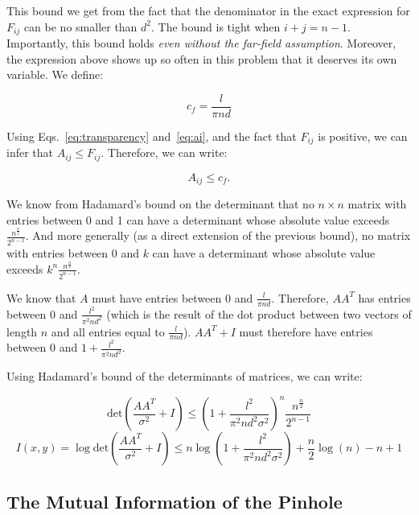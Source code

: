 \documentclass[11pt]{article}
\begin{document}
This bound we get from the fact that the denominator in the exact expression for $F_{ij}$ can be no smaller than $d^2$. The bound is tight when $i+j = n-1$. Importantly, this bound holds \emph{even without the far-field assumption}. Moreover, the expression above shows up so often in this problem that it deserves its own variable. We define:

\begin{equation}
    c_f = \frac{l}{\pi nd}
\end{equation}

Using Eqs.~\ref{eq:transparency} and~\ref{eq:ai}, and the fact that $F_{ij}$ is positive, we can infer that $A_{ij} \le F_{ij}$. Therefore, we can write:

\begin{equation}
    \label{eq:eltwiseupperbound}
A_{ij} \le c_f.
\end{equation}

We know from Hadamard's bound on the determinant that no $n \times n$ matrix with entries between 0 and 1 can have a determinant whose absolute value exceeds $\frac{n^{\frac{n}{2}}}{2^{n-1}}$. And more generally (as a direct extension of the previous bound), no matrix with entries between 0 and $k$ can have a determinant whose absolute value exceeds $k^n\frac{n^{\frac{n}{2}}}{2^{n-1}}$. 

We know that $A$ must have entries between 0 and $\frac{l}{\pi nd}$. Therefore, $AA^T$ has entries between 0 and $\frac{l^2}{\pi^2 n d^2}$ (which is the result of the dot product between two vectors of length $n$ and all entries equal to $\frac{l}{\pi nd}$). $AA^T + I$ must therefore have entries between 0 and $1 + \frac{l^2}{\pi^2 n d^2}$.

Using Hadamard's bound of the determinants of matrices, we can write:

\begin{equation}
    \mathrm{det}(\frac{AA^T}{\sigma^2} + I) \le (1 + \frac{l^2}{\pi^2 n d^2 \sigma^2})^n \frac{n^{\frac{n}{2}}}{2^{n-1}}
\end{equation}
\begin{equation}
    I(x, y) = \log \mathrm{det}(\frac{AA^T}{\sigma^2} + I) \le n \log(1 + \frac{l^2}{\pi^2 n d^2 \sigma^2}) + \frac{n}{2}\log(n) - n + 1
\end{equation}

\subsection{The Mutual Information of the Pinhole}
\end{document}
